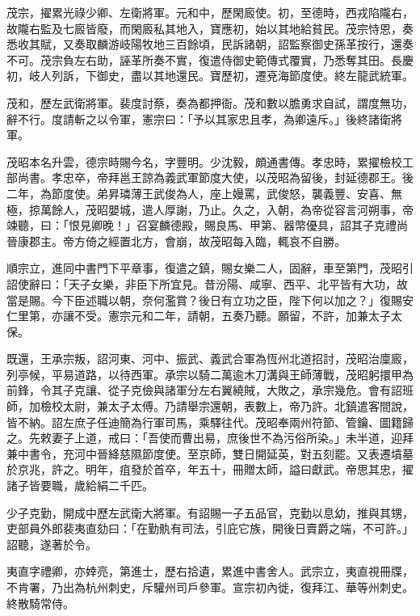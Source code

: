 \begin{pinyinscope}
 茂宗，擢累光祿少卿、左衛將軍。元和中，歷閑廄使。初，至德時，西戎陷隴右，故隴右監及七廄皆廢，而閑廄私其地入，寶應初，始以其地給貧民。茂宗恃恩，奏悉收其賦，又奏取麟游岐陽牧地三百餘頃，民訴諸朝，詔監察御史孫革按行，還奏不可。茂宗負左右助，誣革所奏不實，復遣侍御史範傳式覆實，乃悉奪其田。長慶初，岐人列訴，下御史，盡以其地還民。寶歷初，遷兗海節度使。終左龍武統軍。



 茂和，歷左武衛將軍。裴度討蔡，奏為都押衙。茂和數以膽勇求自試，謂度無功，辭不行。度請斬之以令軍，憲宗曰：「予以其家忠且孝，為卿遠斥。」後終諸衛將軍。



 茂昭本名升雲，德宗時賜今名，字豐明。少沈毅，頗通書傳。孝忠時，累擢檢校工部尚書。孝忠卒，帝拜邕王諒為義武軍節度大使，以茂昭為留後，封延德郡王。後二年，為節度使。弟昇璘薄王武俊為人，座上嫚罵，武俊怒，襲義豐、安喜、無極，掠萬餘人，茂昭嬰城，遣人厚謝，乃止。久之，入朝，為帝從容言河朔事，帝竦聽，曰：「恨見卿晚！」召宴麟德殿，賜良馬、甲第、器幣優具，詔其子克禮尚晉康郡主。帝方倚之經置北方，會崩，故茂昭每入臨，輒哀不自勝。



 順宗立，進同中書門下平章事，復遣之鎮，賜女樂二人，固辭，車至第門，茂昭引詔使辭曰：「天子女樂，非臣下所宜見。昔汾陽、咸寧、西平、北平皆有大功，故當是賜。今下臣述職以朝，奈何濫賞？後日有立功之臣，陛下何以加之？」復賜安仁里第，亦讓不受。憲宗元和二年，請朝，五奏乃聽。願留，不許，加兼太子太保。



 既還，王承宗叛，詔河東、河中、振武、義武合軍為恆州北道招討，茂昭治廩廄，列亭候，平易道路，以待西軍。承宗以騎二萬逾木刀溝與王師薄戰，茂昭躬擐甲為前鋒，令其子克讓、從子克儉與諸軍分左右翼繞賊，大敗之，承宗幾危。會有詔班師，加檢校太尉，兼太子太傅。乃請舉宗還朝，表數上，帝乃許。北鎮遣客間說，皆不納。詔左庶子任迪簡為行軍司馬，乘驛往代。茂昭奉兩州符節、管鑰、圖籍歸之。先敕妻子上道，戒曰：「吾使而曹出易，庶後世不為污俗所染。」未半道，迎拜兼中書令，充河中晉絳慈隰節度使。至京師，雙日開延英，對五刻罷。又表遷墳墓於京兆，許之。明年，疽發於首卒，年五十，冊贈太師，謚曰獻武。帝思其忠，擢諸子皆要職，歲給絹二千匹。



 少子克勤，開成中歷左武衛大將軍。有詔賜一子五品官，克勤以息幼，推與其甥，吏部員外郎裴夷直劾曰：「在勤骫有司法，引庇它族，開後日賣爵之端，不可許。」詔聽，遂著於令。



 夷直字禮卿，亦婞亮，第進士，歷右拾遺，累進中書舍人。武宗立，夷直視冊牒，不肯署，乃出為杭州刺史，斥驩州司戶參軍。宣宗初內徙，復拜江、華等州刺史。終散騎常侍。




\end{pinyinscope}
